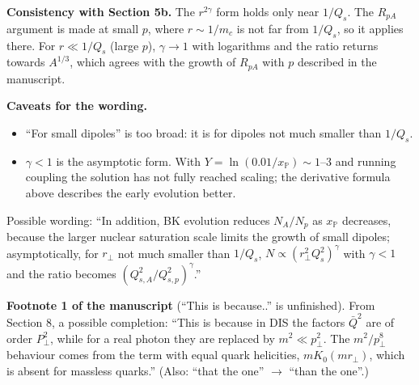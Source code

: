 \documentclass[12pt]{article}
\begin{document}
\textbf{Consistency with Section 5b.} The $r^{2\gamma}$ form holds only near $1/Q_s$. The $R_{pA}$ argument is
made at small $p$, where $r\sim1/m_c$ is not far from $1/Q_s$, so it applies there. For $r\ll1/Q_s$ (large
$p$), $\gamma\to1$ with logarithms and the ratio returns towards $A^{1/3}$, which agrees with the growth of
$R_{pA}$ with $p$ described in the manuscript.

\textbf{Caveats for the wording.}
\begin{itemize}
\item ``For small dipoles'' is too broad: it is for dipoles not much smaller than $1/Q_s$.
\item $\gamma<1$ is the asymptotic form. With $Y=\ln(0.01/x_{\mathbb P})\sim1$--$3$ and running coupling the
solution has not fully reached scaling; the derivative formula above describes the early evolution
better.
\end{itemize}
Possible wording: ``In addition, BK evolution reduces $N_A/N_p$ as $x_{\mathbb P}$ decreases, because the
larger nuclear saturation scale limits the growth of small dipoles; asymptotically, for $r_\perp$ not much
smaller than $1/Q_s$, $N\propto(r_\perp^2Q_s^2)^\gamma$ with $\gamma<1$ and the ratio becomes
$(Q_{s,A}^2/Q_{s,p}^2)^\gamma$.''

\textbf{Footnote 1 of the manuscript} (``This is because..'' is unfinished). From Section 8, a possible
completion: ``This is because in DIS the factors $\bar Q^2$ are of order $P_\perp^2$, while for a real photon
they are replaced by $m^2\ll p_\perp^2$. The $m^2/p_\perp^8$ behaviour comes from the term with equal quark
helicities, $mK_0(mr_\perp)$, which is absent for massless quarks.'' (Also: ``that the one'' $\to$ ``than
the one''.)
\end{document}
